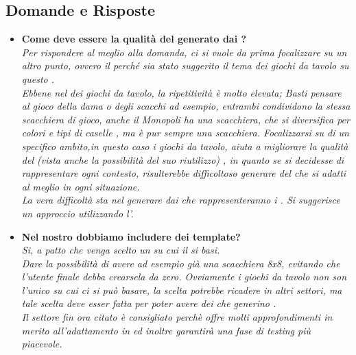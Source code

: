 	  \subsection{Domande e Risposte}
	   \begin{itemize}
	   
	   	\item 
	   		\textbf{Come deve essere la qualità del  generato dai   ?\\}
	    	\justifying
	      		\emph{
	      		Per rispondere al meglio alla domanda, ci si vuole da prima focalizzare su un altro punto, ovvero il perché sia stato suggerito il tema dei giochi da tavolo su questo .\\
    		Ebbene nel  dei giochi da tavolo, la ripetitività è molto elevata; Basti pensare al gioco della dama o degli scacchi ad esempio, entrambi condividono la stessa scacchiera di gioco, anche il Monopoli ha una scacchiera, che si diversifica per colori e tipi di caselle , ma è pur sempre una scacchiera.
	      		Focalizzarsi su di un specifico ambito,in questo caso i giochi da tavolo, aiuta a migliorare la qualità del  (vista anche la possibilità del suo riutilizzo) , in quanto se si decidesse di rappresentare ogni contesto, risulterebbe difficoltoso generare del  che si adatti al meglio in ogni situazione.\\
      		La vera difficoltà sta nel generare  dai  che rappresenteranno i . Si suggerisce un approccio utilizzando l'.\\}
			  	
	      \item
	      \textbf{Nel nostro  dobbiamo includere dei template?\\}
		\justifying
		\emph{Si, a patto che venga scelto un  su cui il  si basi.\\
		Dare la possibilità di avere ad esempio già una scacchiera 8x8, evitando che l'utente finale debba crearsela da zero.
		Ovviamente i giochi da tavolo non son l'unico  su cui ci si può basare, la scelta potrebbe ricadere in altri settori, ma tale scelta deve esser fatta per poter avere dei  che generino .\\
	Il settore fin ora citato è consigliato perchè offre molti approfondimenti in merito all'adattamento in  ed inoltre garantirà una fase di testing più piacevole. \\}
	

\end{itemize}
